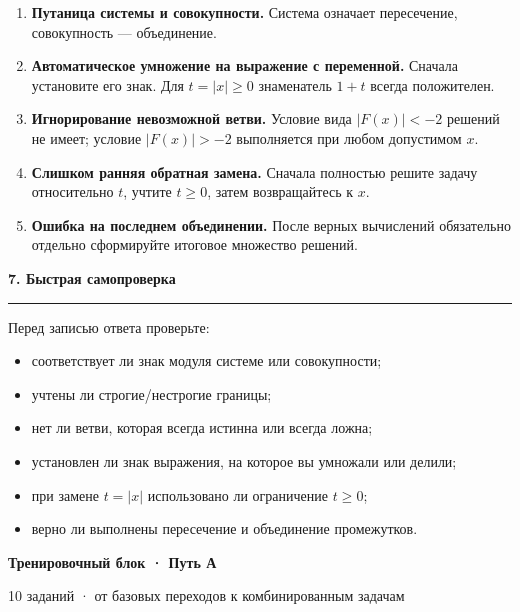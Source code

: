 \documentclass[a4paper,12pt]{article}
\newcommand{\lessonsection}[1]{%
  \vspace{0.5em}
  {\Large\bfseries\color{darkaccent}#1}\par\vspace{0.35em}
  {\color{accent}\rule{\linewidth}{0.6pt}}\vspace{0.6em}
}
\newcommand{\key}[1]{\textbf{\color{darkaccent}#1}}
\begin{document}
\begin{enumerate}
  \item \key{Путаница системы и совокупности.} Система означает пересечение, совокупность --- объединение.
  \item \key{Автоматическое умножение на выражение с переменной.} Сначала установите его знак. Для $t=|x|\ge0$ знаменатель $1+t$ всегда положителен.
  \item \key{Игнорирование невозможной ветви.} Условие вида $|F(x)|<-2$ решений не имеет; условие $|F(x)|>-2$ выполняется при любом допустимом $x$.
  \item \key{Слишком ранняя обратная замена.} Сначала полностью решите задачу относительно $t$, учтите $t\ge0$, затем возвращайтесь к $x$.
  \item \key{Ошибка на последнем объединении.} После верных вычислений обязательно отдельно сформируйте итоговое множество решений.
\end{enumerate}

\lessonsection{7. Быстрая самопроверка}

Перед записью ответа проверьте:
\begin{itemize}
  \item соответствует ли знак модуля системе или совокупности;
  \item учтены ли строгие/нестрогие границы;
  \item нет ли ветви, которая всегда истинна или всегда ложна;
  \item установлен ли знак выражения, на которое вы умножали или делили;
  \item при замене $t=|x|$ использовано ли ограничение $t\ge0$;
  \item верно ли выполнены пересечение и объединение промежутков.
\end{itemize}

\clearpage

\thispagestyle{plain}
\begin{center}
{\Large\bfseries\color{darkaccent}Тренировочный блок · Путь А}\par
\vspace{2mm}
{\color{softgray}10 заданий · от базовых переходов к комбинированным задачам}\par
\end{center}
\vspace{5mm}
\end{document}
